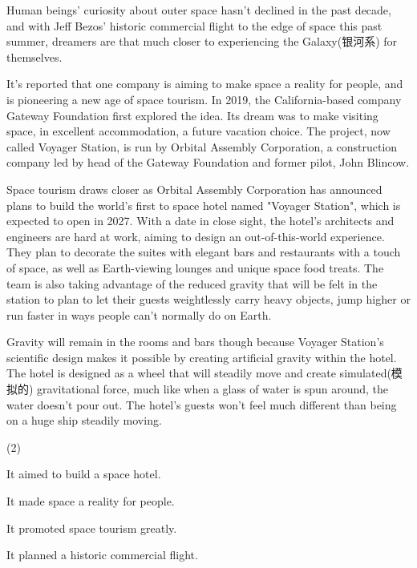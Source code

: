 \documentclass{英语试卷}
\begin{document}
\par Human beings' curiosity about outer space hasn't declined in the past decade, and with Jeff Bezos' historic commercial flight to the edge of space this past summer, dreamers are that much closer to experiencing the Galaxy(银河系) for themselves.\par
\par It's reported that one company is aiming to make space a reality for people, and is pioneering a new age of space tourism. In 2019, the California-based company Gateway Foundation first explored the idea. Its dream was to make visiting space, in excellent accommodation, a future vacation choice. The project, now called Voyager Station, is run by Orbital Assembly Corporation, a construction company led by head of the Gateway Foundation and former pilot, John Blincow.\par
\par Space tourism draws closer as Orbital Assembly Corporation has announced plans to build the world's first to space hotel named "Voyager Station", which is expected to open in 2027. With a date in close sight, the hotel's architects and engineers are hard at work, aiming to design an out-of-this-world experience. They plan to decorate the suites with elegant bars and restaurants with a touch of space, as well as Earth-viewing lounges and unique space food treats. The team is also taking advantage of the reduced gravity that will be felt in the station to plan to let their guests weightlessly carry heavy objects, jump higher or run faster in ways people can't normally do on Earth.\par
\par Gravity will remain in the rooms and bars though because Voyager Station's scientific design makes it possible by creating artificial gravity within the hotel. The hotel is designed as a wheel that will steadily move and create simulated(模拟的) gravitational force, much like when a glass of water is spun around, the water doesn't pour out. The hotel's guests won't feel much different than being on a huge ship steadily moving.\par
{}
\begin{choices}(2)
  \item It aimed to build a space hotel.
  \item It made space a reality for people.
  \item It promoted space tourism greatly.
  \item It planned a historic commercial flight.
\end{choices}
\end{document}
